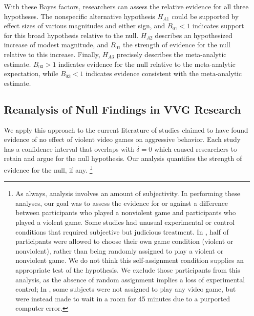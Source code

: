 \documentclass[man]{apa6}
\begin{document}
With these Bayes factors, researchers can assess the relative evidence for all three hypotheses. The nonspecific alternative hypothesis $H_{A1}$ could be supported by effect sizes of various magnitudes and either sign, and $B_{01} < 1$ indicates support for this broad hypothesis relative to the null. $H_{A2}$ describes an hypothesized increase of modest magnitude, and $B_{01}$ the strength of evidence for the null relative to this increase. Finally, $H_{A3}$ precisely describes the meta-analytic estimate. $B_{03} > 1$ indicates evidence for the null relative to the meta-analytic expectation, while $B_{03} < 1$ indicates evidence consistent with the meta-analytic estimate. 

\subsection{Reanalysis of Null Findings in VVG Research}
We apply this approach to the current literature of studies claimed to have found evidence of no effect of violent video games on aggressive behavior. Each study has a confidence interval that overlaps with $\delta = 0$ which caused researchers to retain and argue for the null hypothesis. Our analysis quantifies the strength of evidence for the null, if any.
\footnote{As always, analysis involves an amount of subjectivity. In performing these analyses, our goal was to assess the evidence for or against a difference between participants who played a nonviolent game and participants who played a violent game. Some studies had unusual experimental or control conditions that required subjective but judicious treatment. In \citet{Ferguson:etal:2008}, half of participants were allowed to choose their own game condition (violent or nonviolent), rather than being randomly assigned to play a violent or nonviolent game. We do not think this self-assignment condition supplies an appropriate test of the hypothesis. We exclude those participants from this analysis, as the absence of random assignment implies a loss of experimental control;  In \citet{Ferguson:Rueda:2010}, some subjects were not assigned to play any video game, but were instead made to wait in a room for 45 minutes due to a purported computer error.}
\end{document}

